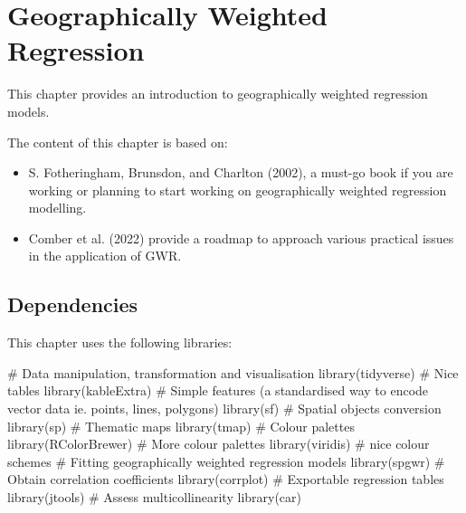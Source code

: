 \documentclass[
  letterpaper,
  DIV=11,
  numbers=noendperiod,
  oneside]{scrreprt}
\newenvironment{Shaded}{\begin{snugshade}}{\end{snugshade}}
\newcommand{\CommentTok}[1]{\textcolor[rgb]{0.37,0.37,0.37}{#1}}
\newcommand{\FunctionTok}[1]{\textcolor[rgb]{0.28,0.35,0.67}{#1}}
\newcommand{\NormalTok}[1]{\textcolor[rgb]{0.00,0.23,0.31}{#1}}
\begin{document}

\chapter{Geographically Weighted Regression}\label{sec-chp9}

This chapter provides an introduction to geographically weighted
regression models.

The content of this chapter is based on:

\begin{itemize}
\item
  S. Fotheringham, Brunsdon, and Charlton (2002), a must-go book if you
  are working or planning to start working on geographically weighted
  regression modelling.
\item
  Comber et al. (2022) provide a roadmap to approach various practical
  issues in the application of GWR.
\end{itemize}

\section{Dependencies}\label{dependencies-6}

This chapter uses the following libraries:

\begin{Shaded}
\begin{Highlighting}[]
\CommentTok{\# Data manipulation, transformation and visualisation}
\FunctionTok{library}\NormalTok{(tidyverse)}
\CommentTok{\# Nice tables}
\FunctionTok{library}\NormalTok{(kableExtra)}
\CommentTok{\# Simple features (a standardised way to encode vector data ie. points, lines, polygons)}
\FunctionTok{library}\NormalTok{(sf) }
\CommentTok{\# Spatial objects conversion}
\FunctionTok{library}\NormalTok{(sp) }
\CommentTok{\# Thematic maps}
\FunctionTok{library}\NormalTok{(tmap) }
\CommentTok{\# Colour palettes}
\FunctionTok{library}\NormalTok{(RColorBrewer) }
\CommentTok{\# More colour palettes}
\FunctionTok{library}\NormalTok{(viridis) }\CommentTok{\# nice colour schemes}
\CommentTok{\# Fitting geographically weighted regression models}
\FunctionTok{library}\NormalTok{(spgwr)}
\CommentTok{\# Obtain correlation coefficients}
\FunctionTok{library}\NormalTok{(corrplot)}
\CommentTok{\# Exportable regression tables}
\FunctionTok{library}\NormalTok{(jtools)}
\CommentTok{\# Assess multicollinearity}
\FunctionTok{library}\NormalTok{(car)}
\end{Highlighting}
\end{Shaded}
\end{document}
